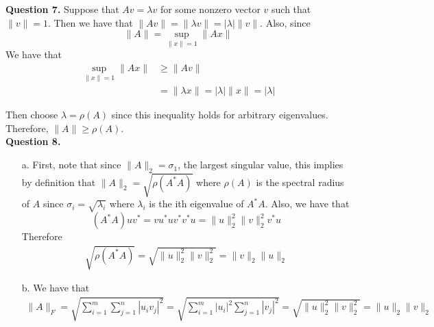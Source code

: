 \documentclass{article}
\begin{document}
\textbf{Question 7.} Suppose that $Av=\lambda v$ for some nonzero vector $v$ such that $\| v \|=1$. Then we have that $\| Av \| = \|\lambda v\| = |\lambda|\|v\|$. Also, since 
\begin{equation*}
    \|A\| = \sup_{\|x\| =1}\|Ax\|
\end{equation*}
We have that 
\begin{align*}
    \sup_{\|x\| = 1}\|Ax\| &\geq \|Av\| \\
    &=\|\lambda x \| = |\lambda|\|x\| = |\lambda|
\end{align*}

Then choose $\lambda = \rho(A)$ since this inequality holds for arbitrary eigenvalues. Therefore, $\|A\| \geq \rho(A)$. \\

\textbf{Question 8. }\\
\begin{itemize}
    \item[a.] First, note that since $\|A\|_2=\sigma_1$, the largest singular value, this implies by definition that $\|A\|_2 = \sqrt{\rho(A^*A)}$ where $\rho(A)$ is the spectral radius of $A$ since $\sigma_i = \sqrt{\lambda_i}$ where $\lambda_i$ is the ith eigenvalue of $A^*A$. Also, we have that 
    \begin{equation*}
        (A^*A) uv^* = vu^*uv^*v^*u = \|u\|_2^2\|v\|_2^2 v^*u
    \end{equation*}
    Therefore
    \begin{align*}
         \sqrt{\rho(A^*A)} = \sqrt{\|u\|_2^2\|v\|_2^2}=\|v\|_2\|u\|_2
    \end{align*} 
    \item[b.] We have that 
    \begin{align*}
        \|A\|_F = \sqrt{\sum_{i=1}^m \sum_{j=1}^n |u_i v_j|^2} = \sqrt{\sum_{i=1}^m |u_i|^2\sum_{j=1}^n |v_j|^2}=\sqrt{\|u\|_2^2\|v\|_2^2}=\|u\|_2 \|v\|_2
    \end{align*} 
\end{itemize}
\end{document}
